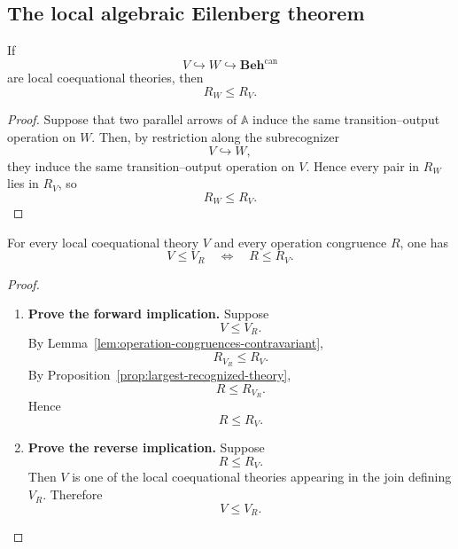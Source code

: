 \subsection{The local algebraic Eilenberg theorem}
\label{subsec:local-algebraic-eilenberg}

\begin{lemma}
\label{lem:operation-congruences-contravariant}
    If
    \[
        V\hookrightarrow W\hookrightarrow\mathbf{Beh}^{\mathrm{can}}
    \]
    are local coequational theories, then
    \[
        R_W\leq R_V.
    \]
\end{lemma}

\begin{proof}
    Suppose that two parallel arrows of \(\mathbb A\) induce the same
    transition--output operation on \(W\). Then, by restriction along the
    subrecognizer
    \[
        V\hookrightarrow W,
    \]
    they induce the same transition--output operation on \(V\). Hence every
    pair in \(R_W\) lies in \(R_V\), so
    \[
        R_W\leq R_V.
    \]
\end{proof}

\begin{theorem}
\label{thm:local-operation-galois}
    For every local coequational theory \(V\) and every operation congruence
    \(R\), one has
    \[
        V\leq V_R
        \quad\Longleftrightarrow\quad
        R\leq R_V.
    \]
\end{theorem}

\begin{proof}
    \leavevmode
    \begin{enumerate}
        \item \textbf{Prove the forward implication.}
        Suppose
        \[
            V\leq V_R.
        \]
        By Lemma~\ref{lem:operation-congruences-contravariant},
        \[
            R_{V_R}\leq R_V.
        \]
        By Proposition~\ref{prop:largest-recognized-theory},
        \[
            R\leq R_{V_R}.
        \]
        Hence
        \[
            R\leq R_V.
        \]

        \item \textbf{Prove the reverse implication.}
        Suppose
        \[
            R\leq R_V.
        \]
        Then \(V\) is one of the local coequational theories appearing in the
        join defining \(V_R\). Therefore
        \[
            V\leq V_R.
        \]
    \end{enumerate}
\end{proof}

